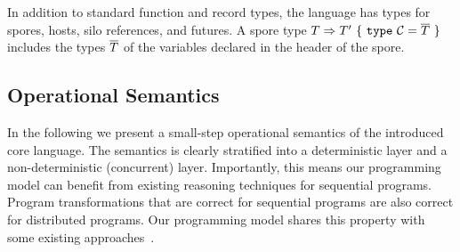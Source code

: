 In addition to standard function and record types, the language has
types for spores, hosts, silo references, and futures. A spore type $T
\Rightarrow T'~\{~\texttt{type}~\mathcal{C} = \overline{T}~\}$ includes the
types $\overline{T}$ of the variables declared in the header of the spore.

\subsection{Operational Semantics}\label{sec:opsem}

In the following we present a small-step operational semantics of the
introduced core language. The semantics is clearly stratified into a
deterministic layer and a non-deterministic (concurrent)
layer. Importantly, this means our programming model can benefit from
existing reasoning techniques for sequential programs. Program
transformations that are correct for sequential programs are also
correct for distributed programs. Our programming model shares this
property with some existing approaches~\cite{ConcurrentHaskell}.

